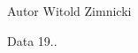 \begin{DoxyAuthor}{Autor}
Witold Zimnicki 
\end{DoxyAuthor}
\begin{DoxyDate}{Data}
19.. 
\end{DoxyDate}
